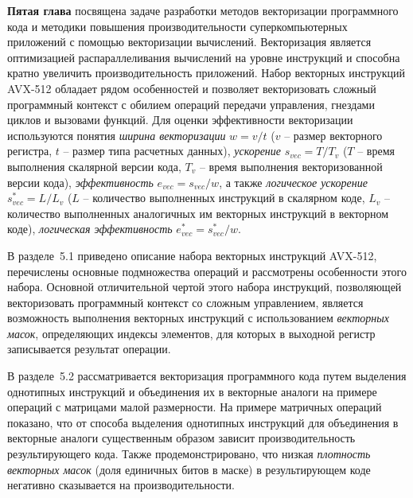 \documentclass[a4paper,14pt]{extarticle}                     %
\theoremstyle{plain}                                         %
\begin{document}

\textbf{Пятая глава} посвящена задаче разработки методов векторизации программного кода и методики повышения производительности суперкомпьютерных приложений с помощью векторизации вычислений.
Векторизация является оптимизацией распараллеливания вычислений на уровне инструкций и способна кратно увеличить производительность приложений.
Набор векторных инструкций AVX-512 обладает рядом особенностей и позволяет векторизовать сложный программный контекст с обилием операций передачи управления, гнездами циклов и вызовами функций.
Для оценки эффективности векторизации используются понятия \textit{ширина векторизации} $w = v/t$ ($v$ -- размер векторного регистра, $t$ -- размер типа расчетных данных), \textit{ускорение} $s_{vec} = T/T_v$ ($T$ -- время выполнения скалярной версии кода, $T_v$ -- время выполнения векторизованной версии кода), \textit{эффективность} $e_{vec} = s_{vec}/w$, а также \textit{логическое ускорение} $s_{vec}^{*} = L/L_v$ ($L$ -- количество выполненных инструкций в скалярном коде, $L_v$ -- количество выполненных аналогичных им векторных инструкций в векторном коде), \textit{логическая эффективность} $e_{vec}^{*} = s_{vec}^{*}/w$.


В разделе~5.1 приведено описание набора векторных инструкций AVX-512, перечислены основные подмножества операций и рассмотрены особенности этого набора.
Основной отличительной чертой этого набора инструкций, позволяющей векторизовать программный контекст со сложным управлением, является возможность выполнения векторных инструкций с использованием \textit{векторных масок}, определяющих индексы элементов, для которых в выходной регистр записывается результат операции.


В разделе~5.2 рассматривается векторизация программного кода путем выделения однотипных инструкций и объединения их в векторные аналоги на примере операций с матрицами малой размерности.
На примере матричных операций показано, что от способа выделения однотипных инструкций для объединения в векторные аналоги существенным образом зависит производительность результирующего кода.
Также продемонстрировано, что низкая \textit{плотность векторных масок} (доля единичных битов в маске) в результирующем коде негативно сказывается на производительности.
\end{document}
